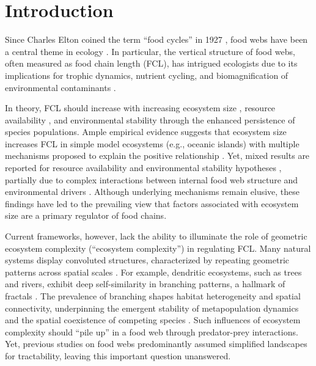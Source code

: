 \documentclass[11pt, class=article, crop=false]{standalone}
\begin{document}
\newpage

\section{Introduction}
Since Charles Elton coined the term ``food cycles'' in 1927 \citep{elton_animal_1927}, food webs have been a central theme in ecology \citep{paine_food_1966, pimm_food_1991, post_long_2002}.
In particular, the vertical structure of food webs, often measured as food chain length (FCL), has intrigued ecologists due to its implications for trophic dynamics, nutrient cycling, and biomagnification of environmental contaminants \citep{post_long_2002}.

In theory, FCL should increase with increasing ecosystem size \citep{schoener_food_1989}, resource availability \citep{oksanen_exploitation_1981}, and environmental stability \citep{pimm_number_1977} through the enhanced persistence of species populations.
Ample empirical evidence suggests that ecosystem size increases FCL in simple model ecosystems (e.g., oceanic islands) \citep{vander_zanden_patterns_1999, post_ecosystem_2000, takimoto_ecosystem_2008, doi_resource_2009} with multiple mechanisms proposed to explain the positive relationship \citep{takimoto_effects_2012, ward_mechanistic_2017, mcintosh_capacity_2018, terui_spatial_2019}.
Yet, mixed results are reported for resource availability and environmental stability hypotheses \citep{takimoto_environmental_2013, warfe_productivity_2013, guo_towards_2023}, partially due to complex interactions between internal food web structure and environmental drivers \citep{takimoto_effects_2012, shibasaki_food_2024}.
Although underlying mechanisms remain elusive, these findings have led to the prevailing view that factors associated with ecosystem size are a primary regulator of food chains.

Current frameworks, however, lack the ability to illuminate the role of geometric ecosystem complexity (``ecosystem complexity'') in regulating FCL.
Many natural systems display convoluted structures, characterized by repeating geometric patterns across spatial scales \citep{rodriguez-iturbe_fractal_2001, turner_landscape_2015}.
For example, dendritic ecosystems, such as trees and rivers, exhibit deep self-similarity in branching patterns, a hallmark of fractals \citep{rodriguez-iturbe_fractal_2001, terui_revisiting_2024}.
The prevalence of branching shapes habitat heterogeneity and spatial connectivity, underpinning the emergent stability of metapopulation dynamics \citep{yeakel_synchronisation_2014, moore_emergent_2015, terui_metapopulation_2018} and the spatial coexistence of competing species  \citep{terui_emergent_2021}.
Such influences of ecosystem complexity should ``pile up'' in a food web through predator-prey interactions.
Yet, previous studies on food webs predominantly assumed simplified landscapes for tractability, leaving this important question unanswered.
\end{document}
